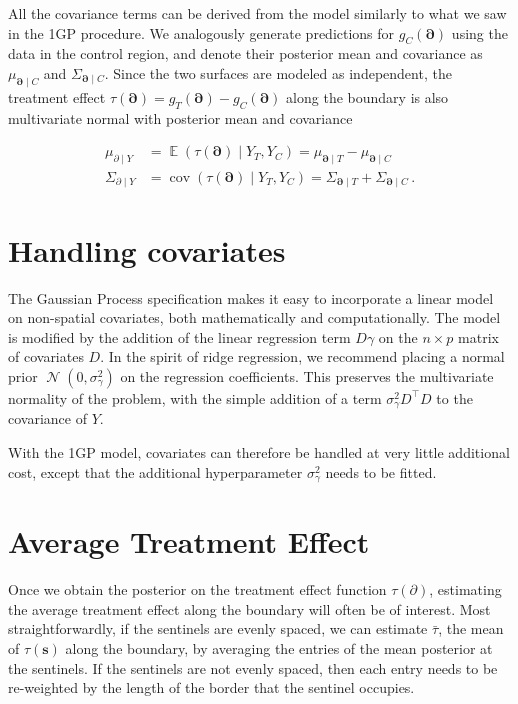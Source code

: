 \documentclass[letter]{article}
\newcommand{\genericdel}[3]{%
      \left#1#3\right#2
    }
\newcommand{\del}[1]{\genericdel(){#1}}
\DeclareMathOperator{\E}{\mathbb{E}}
\DeclareMathOperator{\cov}{{cov}}
\DeclareMathOperator{\normal}{\mathcal{N}}
\newcommand{\trans}{^{\intercal}}
\newcommand{\sigmagamma}{\sigma_{\gamma}}
\newcommand{\svec}{\mathbold{s}}
\newcommand{\boundary}{\partial}
\newcommand{\sentinels}{\bm{\boundary}}
\newcommand{\linavg}{\bar{\tau}}
\begin{document}
All the covariance terms can be derived from the model similarly to what
we saw in the 1GP procedure. We analogously generate predictions for
\(g_C(\sentinels)\) using the data in the control region, and denote
their posterior mean and covariance as \(\mu_{\sentinels \mid C}\) and
\(\Sigma_{\sentinels \mid C}\). Since the two surfaces are modeled as
independent, the treatment effect
\(\tau(\sentinels)=g_T(\sentinels)-g_C(\sentinels)\) along the boundary
is also multivariate normal with posterior mean and covariance

\begin{equation}\begin{split}
    \mu_{\boundary \mid Y} &= \E \del{\tau(\sentinels) \mid Y_T, Y_C} = \mu_{\sentinels \mid T} - \mu_{\sentinels \mid C} \\
    \Sigma_{\boundary \mid Y} &= \cov\del{\tau(\sentinels) \mid Y_T, Y_C} = \Sigma_{\sentinels \mid T} + \Sigma_{\sentinels \mid C}\,.
\end{split}\label{eq:postvar2gp}\end{equation}
    


    	\section{Handling covariates}\label{handling-covariates}

The Gaussian Process specification makes it easy to incorporate a linear
model on non-spatial covariates, both mathematically and
computationally. The model is modified by the addition of the linear
regression term \(D \gamma\) on the \(n \times p\) matrix of covariates
\(D\). In the spirit of ridge regression, we recommend placing a normal
prior \(\normal(0,\sigmagamma^2)\) on the regression coefficients. This
preserves the multivariate normality of the problem, with the simple
addition of a term \(\sigmagamma^2 D\trans D\) to the covariance of
\(Y\).

With the 1GP model, covariates can therefore be handled at very little
additional cost, except that the additional hyperparameter
\(\sigmagamma^2\) needs to be fitted.
    


    	\section{Average Treatment Effect}\label{average-treatment-effect}

Once we obtain the posterior on the treatment effect function
\(\tau(\boundary)\), estimating the average treatment effect along the
boundary will often be of interest. Most straightforwardly, if the
sentinels are evenly spaced, we can estimate \(\linavg\), the mean of
\(\tau(\svec)\) along the boundary, by averaging the entries of the mean
posterior at the sentinels. If the sentinels are not evenly spaced, then
each entry needs to be re-weighted by the length of the border that the
sentinel occupies.
\end{document}
